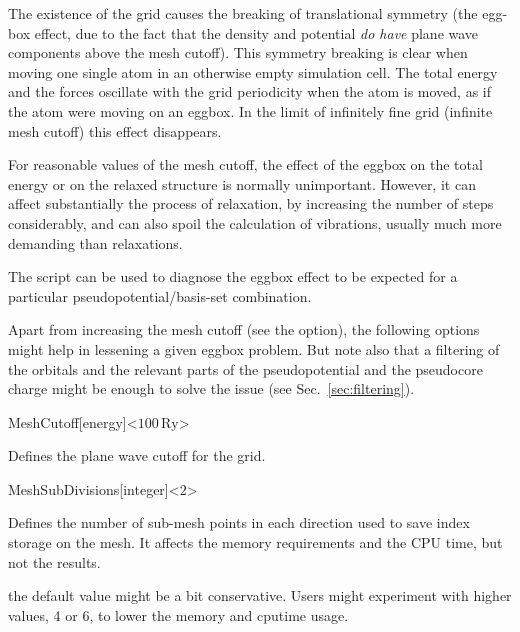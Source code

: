 The existence of the grid causes the breaking of translational
symmetry (the egg-box effect, due to the fact that the density
and potential \emph{do have} plane wave components above
the mesh cutoff).  This symmetry breaking is clear when
moving one single atom in an otherwise empty simulation cell. The
total energy and the forces oscillate with the grid periodicity when
the atom is moved, as if the atom were moving on an eggbox. In the
limit of infinitely fine grid (infinite mesh cutoff) this effect
disappears.

For reasonable values of the mesh cutoff, the effect of the eggbox
on the total energy or on the relaxed structure is normally unimportant.
However, it can affect substantially the process of relaxation, by
increasing the number of steps considerably, and can also spoil the
calculation of vibrations, usually much more demanding than relaxations.

The  script can be used to
diagnose the eggbox effect to be expected for a particular
pseudopotential/basis-set combination.

Apart from increasing the mesh cutoff (see the  option),
the following options might help in lessening a given eggbox problem. But
note also that a filtering of the orbitals and the relevant parts of
the pseudopotential and the pseudocore charge might be enough to solve
the issue (see Sec.~\ref{sec:filtering}).

\begin{fdfentry}{MeshCutoff}[energy]<$100\,\mathrm{Ry}$>

  Defines the plane wave cutoff for the grid.
  
 
\end{fdfentry}

\begin{fdfentry}{MeshSubDivisions}[integer]<$2$>
  
  Defines the number of sub-mesh points in each direction used
  to save index storage on the mesh. It affects the memory
  requirements and the CPU time, but not the results. 

  \note the default value might be a bit conservative. Users might
  experiment with higher values, 4 or 6, to lower the memory and
  cputime usage.

\end{fdfentry}

